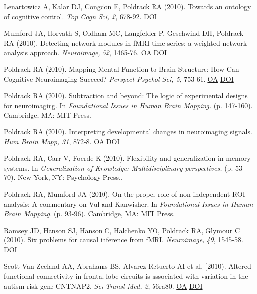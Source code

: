 \documentclass[10pt, letterpaper]{article}
\begin{document}
Lenartowicz A, Kalar DJ, Congdon E, Poldrack RA (2010). Towards an ontology of cognitive control. \textit{Top Cogn Sci, 2}, 678-92. \href{http://dx.doi.org/10.1111/j.1756-8765.2010.01100.x}{DOI} \vspace{2mm}

Mumford JA, Horvath S, Oldham MC, Langfelder P, Geschwind DH, Poldrack RA (2010). Detecting network modules in fMRI time series: a weighted network analysis approach. \textit{Neuroimage, 52}, 1465-76. \href{https://www.ncbi.nlm.nih.gov/pmc/articles/PMC3632300}{OA} \href{http://dx.doi.org/10.1016/j.neuroimage.2010.05.047}{DOI} \vspace{2mm}

Poldrack RA (2010). Mapping Mental Function to Brain Structure: How Can Cognitive Neuroimaging Succeed? \textit{Perspect Psychol Sci, 5}, 753-61. \href{https://www.ncbi.nlm.nih.gov/pmc/articles/PMC4112478}{OA} \href{http://dx.doi.org/10.1177/1745691610388777}{DOI} \vspace{2mm}

Poldrack RA (2010). Subtraction and beyond: The logic of experimental designs for neuroimaging. In \textit{Foundational Issues in Human Brain Mapping.} (p. 147-160). Cambridge, MA: MIT Press. \vspace{2mm}

Poldrack RA (2010). Interpreting developmental changes in neuroimaging signals. \textit{Hum Brain Mapp, 31}, 872-8. \href{https://www.ncbi.nlm.nih.gov/pmc/articles/PMC6870770}{OA} \href{http://dx.doi.org/10.1002/hbm.21039}{DOI} \vspace{2mm}

Poldrack RA, Carr V, Foerde K (2010). Flexibility and generalization in memory systems. In \textit{Generalization of Knowledge: Multidisciplinary perspectives.} (p. 53-70). New York, NY: Psychology Press.. \vspace{2mm}

Poldrack RA, Mumford JA (2010). On the proper role of non-independent ROI analysis: A commentary on Vul and Kanwisher. In \textit{Foundational Issues in Human Brain Mapping.} (p. 93-96). Cambridge, MA: MIT Press. \vspace{2mm}

Ramsey JD, Hanson SJ, Hanson C, Halchenko YO, Poldrack RA, Glymour C (2010). Six problems for causal inference from fMRI. \textit{Neuroimage, 49}, 1545-58. \href{http://dx.doi.org/10.1016/j.neuroimage.2009.08.065}{DOI} \vspace{2mm}

Scott-Van Zeeland AA, Abrahams BS, Alvarez-Retuerto AI et al. (2010). Altered functional connectivity in frontal lobe circuits is associated with variation in the autism risk gene CNTNAP2. \textit{Sci Transl Med, 2}, 56ra80. \href{https://www.ncbi.nlm.nih.gov/pmc/articles/PMC3065863}{OA} \href{http://dx.doi.org/10.1126/scitranslmed.3001344}{DOI} \vspace{2mm}
\end{document}
